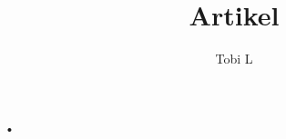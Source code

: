 \documentclass[10pt,a4paper,twoside]{book}
\author{Tobi L}
\title{Artikel}
\begin{document}
\maketitle
\tableofcontents
•
\end{document}

